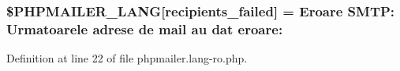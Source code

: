 \subsubsection[{\texorpdfstring{\$\+P\+H\+P\+M\+A\+I\+L\+E\+R\+\_\+\+L\+A\+NG}{$PHPMAILER_LANG}}]{\setlength{\rightskip}{0pt plus 5cm}\$P\+H\+P\+M\+A\+I\+L\+E\+R\+\_\+\+L\+A\+NG\mbox{[}\textquotesingle{}recipients\+\_\+failed\textquotesingle{}\mbox{]} = \textquotesingle{}Eroare S\+M\+T\+P\+: Urmatoarele adrese de mail au dat eroare\+: \textquotesingle{}}\hypertarget{phpmailer_8lang-ro_8php_a7589d30bb9b368327c2df015f3e6bcba}{}\label{phpmailer_8lang-ro_8php_a7589d30bb9b368327c2df015f3e6bcba}


Definition at line 22 of file phpmailer.\+lang-\/ro.\+php.

